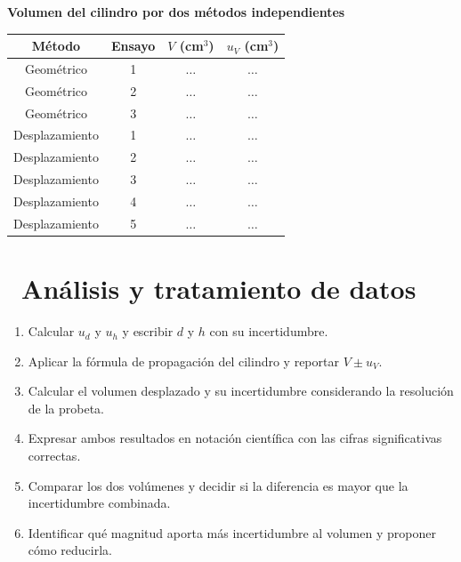 \documentclass[11pt,a4paper]{article}
\newcommand{\iconotexto}[2]{\textcolor{cyanNeon}{\faIcon{#1}}~#2}
\begin{document}
\begin{center}
\begin{minipage}{\linewidth}
\centering
{\small
\textbf{Volumen del cilindro por dos métodos independientes}\par\smallskip
\begin{tabular}{@{}cccc@{}}
\toprule
Método & Ensayo & $V$ (cm$^3$) & $u_V$ (cm$^3$) \\
\midrule
Geométrico & 1 & $\ldots$ & $\ldots$ \\
Geométrico & 2 & $\ldots$ & $\ldots$ \\
Geométrico & 3 & $\ldots$ & $\ldots$ \\
Desplazamiento & 1 & $\ldots$ & $\ldots$ \\
Desplazamiento & 2 & $\ldots$ & $\ldots$ \\
Desplazamiento & 3 & $\ldots$ & $\ldots$ \\
Desplazamiento & 4 & $\ldots$ & $\ldots$ \\
Desplazamiento & 5 & $\ldots$ & $\ldots$ \\
\bottomrule
\end{tabular}
}\par{}
\end{minipage}
\end{center}

\section{\iconotexto{calculator}{Análisis y tratamiento de datos}}

\begin{enumerate}[leftmargin=1.4em,itemsep=2pt,topsep=3pt]
  \item Calcular $u_d$ y $u_h$ y escribir $d$ y $h$ con su incertidumbre.
  \item Aplicar la fórmula de propagación del cilindro y reportar $V \pm u_V$.
  \item Calcular el volumen desplazado y su incertidumbre considerando la resolución de la probeta.
  \item Expresar ambos resultados en notación científica con las cifras significativas correctas.
  \item Comparar los dos volúmenes y decidir si la diferencia es mayor que la incertidumbre combinada.
  \item Identificar qué magnitud aporta más incertidumbre al volumen y proponer cómo reducirla.
\end{enumerate}
\end{document}
